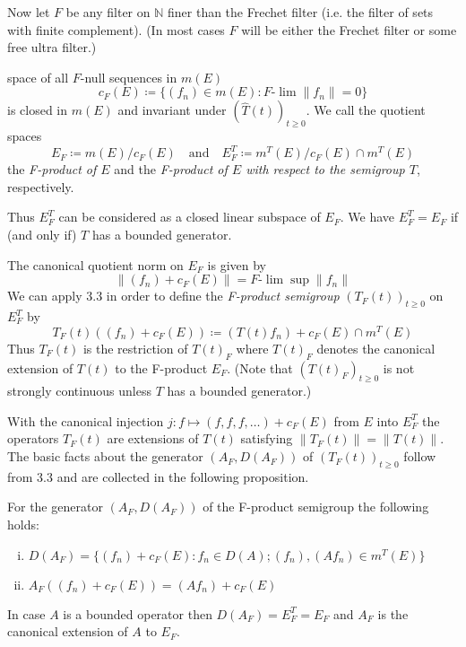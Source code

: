 Now let $F$ be any filter on $\mathbb{N}$ finer than the Frechet filter (i.e. the filter of sets with finite complement).
(In most cases $F$ will be either the Frechet filter or some free ultra filter.)


space of all $F$-null sequences in $m(E)$
\[
    c_{F}(E) \coloneqq \{(f_{n}) \in m(E) : F\text{-}\lim\|f_{n}\| = 0\}
\]
is closed in $m(E)$ and invariant under $(\hat{T}(t))_{t \geq 0}$. 
We call the quotient spaces
\[
    E_{F} \coloneqq m(E)/c_{F}(E) \quad \text{and} \quad E_{F}^{T} \coloneqq m^{T}(E)/c_{F}(E)\cap m^{T}(E)
\]
the \emph{F-product of $E$} and the \emph{F-product of $E$ with respect to the semigroup $T$}, respectively.

Thus $E_{F}^{T}$ can be considered as a closed linear subspace of $E_{F}$. 
We have $E_{F}^{T} = E_{F}$ if (and only if) $T$ has a bounded generator.

The canonical quotient norm on $E_{F}$ is given by
\[
    \|(f_{n}) + c_{F}(E)\| = F\text{-}\lim \sup \|f_{n}\|
\]
We can apply 3.3 in order to define the \emph{F-product semigroup} $(T_{F}(t))_{t \geq 0}$ on $E_{F}^{T}$ by
\[
    T_{F}(t)((f_{n}) + c_{F}(E)) \coloneqq (T(t)f_{n}) + c_{F}(E)\cap m^{T}(E)
\]
Thus $T_{F}(t)$ is the restriction of $T(t)_{F}$ where $T(t)_{F}$ denotes the canonical extension of $T(t)$ to the F-product $E_{F}$. (Note that $(T(t)_{F})_{t \geq 0}$ is not strongly continuous unless $T$ has a bounded generator.)

With the canonical injection $j : f \mapsto (f,f,f,\ldots) + c_{F}(E)$ from $E$ into $E_{F}^{T}$ the operators $T_{F}(t)$ are extensions of $T(t)$ satisfying $\|T_{F}(t)\| = \|T(t)\|$. The basic facts about the generator $(A_{F},D(A_{F}))$ of $(T_{F}(t))_{t \geq 0}$ follow from 3.3 and are collected in the following proposition.
\begin{proposition}\label{prop:a1-3.6}
For the generator $(A_{F},D(A_{F}))$ of the F-product semigroup the following holds:
\begin{enumerate}[(i)]
\item 
$D(A_{F}) = \{(f_{n}) + c_{F}(E) : f_{n} \in D(A); (f_{n}), (Af_{n}) \in m^{T}(E)\}$

\item 
$A_{F}((f_{n}) + c_{F}(E)) = (Af_{n}) + c_{F}(E)$

\end{enumerate}
\end{proposition}
In case $A$ is a bounded operator then $D(A_{F}) = E_{F}^{T} = E_{F}$ and $A_{F}$ is the canonical extension of $A$ to $E_{F}$.

